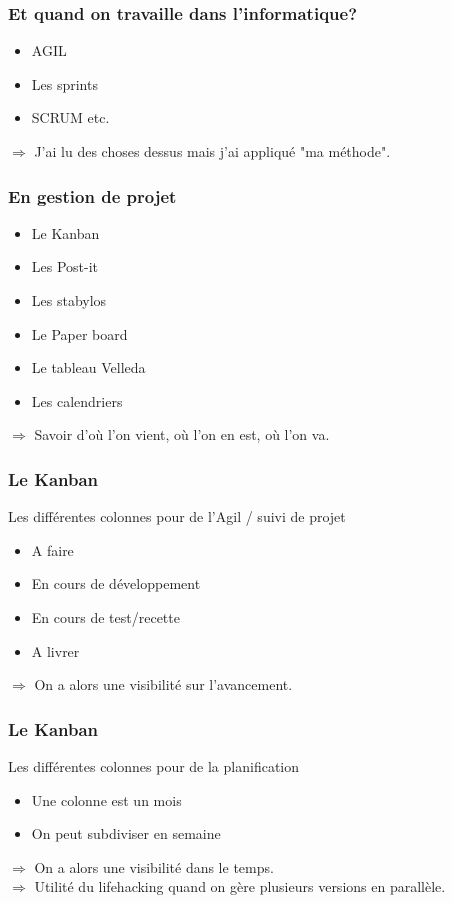 \documentclass{beamer}
\begin{document}
\begin{frame}
\frametitle{Et quand on travaille dans l'informatique?}
\begin{itemize}
\item AGIL
\item Les sprints
\item SCRUM etc.
\end{itemize}
$\Rightarrow$ J'ai lu des choses dessus mais j'ai appliqué "ma méthode".
\end{frame}


\begin{frame}
\frametitle{En gestion de projet}
\begin{itemize}
\item Le Kanban
\item Les Post-it
\item Les stabylos
\item Le Paper board
\item Le tableau Velleda
\item Les calendriers
\end{itemize}
$\Rightarrow$ Savoir d'où l'on vient, où l'on en est, où l'on va.
\end{frame}

\begin{frame}
\frametitle{Le Kanban}
Les différentes colonnes pour de l'Agil / suivi de projet
\begin{itemize}
\item A faire	
\item En cours de développement
\item En cours de test/recette
\item A livrer
\end{itemize}
$\Rightarrow$ On a alors une visibilité sur l'avancement.
\end{frame}

\begin{frame}
\frametitle{Le Kanban}
Les différentes colonnes pour de la planification
\begin{itemize}
\item Une colonne est un mois
\item On peut subdiviser en semaine
\end{itemize}
$\Rightarrow$ On a alors une visibilité dans le temps.
\\$\Rightarrow$ Utilité du lifehacking quand on gère plusieurs versions en parallèle.
\end{frame}
\end{document}
